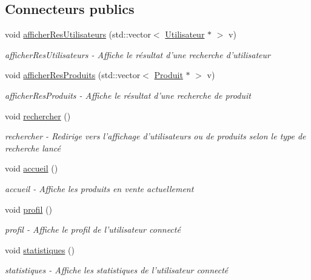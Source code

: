 \subsection*{Connecteurs publics}
\begin{DoxyCompactItemize}
\item 
void \hyperlink{class_ma_fenetre_a4c4a8f4b2f7a79839e2c2250f4835166}{afficher\-Res\-Utilisateurs} (std\-::vector$<$ \hyperlink{class_utilisateur}{Utilisateur} $\ast$ $>$ v)
\begin{DoxyCompactList}\small\item\em afficher\-Res\-Utilisateurs -\/ Affiche le résultat d'une recherche d'utilisateur \end{DoxyCompactList}\item 
void \hyperlink{class_ma_fenetre_a115348adbe409a24a0d381e1fcc62fe7}{afficher\-Res\-Produits} (std\-::vector$<$ \hyperlink{class_produit}{Produit} $\ast$ $>$ v)
\begin{DoxyCompactList}\small\item\em afficher\-Res\-Produits -\/ Affiche le résultat d'une recherche de produit \end{DoxyCompactList}\item 
void \hyperlink{class_ma_fenetre_a8107c2666807db431962fdcd4e942c69}{rechercher} ()
\begin{DoxyCompactList}\small\item\em rechercher -\/ Redirige vers l'affichage d'utilisateurs ou de produits selon le type de recherche lancé \end{DoxyCompactList}\item 
void \hyperlink{class_ma_fenetre_abc0a097122f161ced271718b254206cd}{accueil} ()
\begin{DoxyCompactList}\small\item\em accueil -\/ Affiche les produits en vente actuellement \end{DoxyCompactList}\item 
void \hyperlink{class_ma_fenetre_a08a81ac61e783cf5ed3855ca4f18c84e}{profil} ()
\begin{DoxyCompactList}\small\item\em profil -\/ Affiche le profil de l'utilisateur connecté \end{DoxyCompactList}\item 
void \hyperlink{class_ma_fenetre_abdebcc3a608ba960f92d9c33198afa8e}{statistiques} ()
\begin{DoxyCompactList}\small\item\em statistiques -\/ Affiche les statistiques de l'utilisateur connecté \end{DoxyCompactList}\item 

\end{DoxyCompactItemize}
